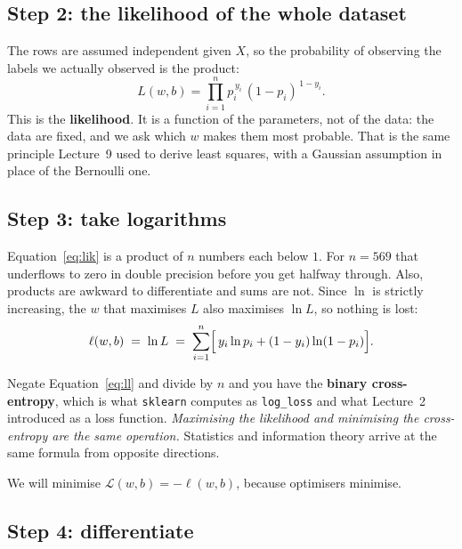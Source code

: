 \documentclass[11pt]{article}
\begin{document}
\subsection{Step 2: the likelihood of the whole dataset}

The rows are assumed independent given $X$, so the probability of observing
the labels we actually observed is the product:
\begin{equation}
  L(w, b) = \prod_{i=1}^{n} p_i^{\,y_i}\,(1-p_i)^{\,1-y_i}.
  \label{eq:lik}
\end{equation}
This is the \textbf{likelihood}. It is a function of the parameters, not of
the data: the data are fixed, and we ask which $w$ makes them most probable.
That is the same principle Lecture~9 used to derive least squares, with a
Gaussian assumption in place of the Bernoulli one.

\subsection{Step 3: take logarithms}

Equation~\eqref{eq:lik} is a product of $n$ numbers each below $1$. For
$n = 569$ that underflows to zero in double precision before you get halfway
through. Also, products are awkward to differentiate and sums are not. Since
$\ln$ is strictly increasing, the $w$ that maximises $L$ also maximises
$\ln L$, so nothing is lost:
\begin{equation}
  \ell(w, b) \;=\; \ln L \;=\;
  \sum_{i=1}^{n}\Bigl[\, y_i \ln p_i + (1 - y_i)\ln(1 - p_i) \Bigr].
  \label{eq:ll}
\end{equation}

\begin{keyidea}
Negate Equation~\eqref{eq:ll} and divide by $n$ and you have the
\textbf{binary cross-entropy}, which is what \texttt{sklearn} computes as
\texttt{log\_loss} and what Lecture~2 introduced as a loss function.
\emph{Maximising the likelihood and minimising the cross-entropy are the same
operation.} Statistics and information theory arrive at the same formula from
opposite directions.
\end{keyidea}

We will minimise $\mathcal{L}(w,b) = -\ell(w,b)$, because optimisers minimise.

\subsection{Step 4: differentiate}
\label{sec:gradient}
\end{document}

